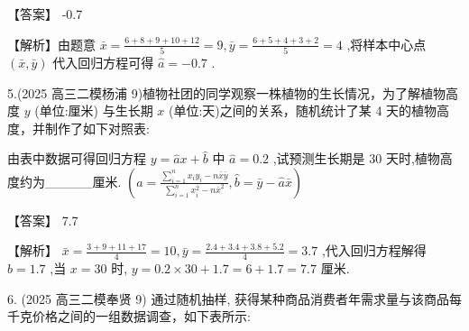 \documentclass[10pt]{article}
\begin{document}
【答案】 -0.7

【解析】由题意 \(\bar{x} = \frac{6 + 8 + 9 + {10} + {12}}{5} = 9,\bar{y} = \frac{6 + 5 + 4 + 3 + 2}{5} = 4\) ,将样本中心点 \(\left( {\bar{x},\bar{y}}\right)\) 代入回归方程可得 \(\widehat{a} =  - {0.7}\) .

5.(2025 高三二模杨浦 9)植物社团的同学观察一株植物的生长情况，为了解植物高度 \(y\) (单位:厘米) 与生长期 \(x\) (单位:天)之间的关系，随机统计了某 4 天的植物高度，并制作了如下对照表:

\begin{center}
\end{center}

由表中数据可得回归方程 \(y = \widehat{a}x + \widehat{b}\) 中 \(\widehat{a} = {0.2}\) ,试预测生长期是 30 天时,植物高度约为\_\_\_\_\_厘米. \(\left( {\widehat{a} = \frac{\mathop{\sum }\limits_{{i = 1}}^{n}{x}_{i}{y}_{i} - n\bar{x}\bar{y}}{\mathop{\sum }\limits_{{i = 1}}^{n}{x}_{i}^{2} - n{\bar{x}}^{2}},\widehat{b} = \bar{y} - \widehat{a}\bar{x}}\right)\)

【答案】 7.7

【解析】 \(\bar{x} = \frac{3 + 9 + {11} + {17}}{4} = {10},\bar{y} = \frac{{2.4} + {3.4} + {3.8} + {5.2}}{4} = {3.7}\) ,代入回归方程解得 \(\widehat{b} = {1.7}\) ,当 \(x = {30}\) 时, \(y = {0.2} \times  {30} + {1.7} = 6 + {1.7} = {7.7}\) 厘米.

6. (2025 高三二模奉贤 9) 通过随机抽样, 获得某种商品消费者年需求量与该商品每千克价格之间的一组数据调查，如下表所示:

\begin{center}
\end{center}
\end{document}
